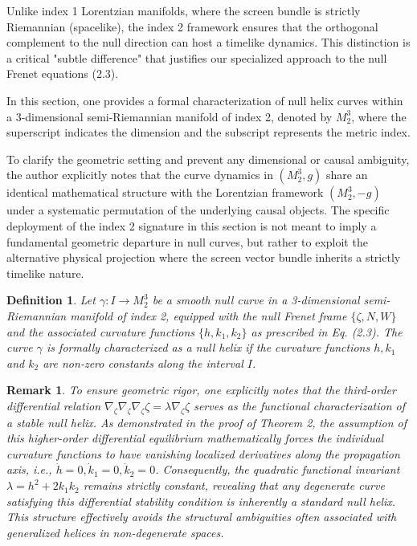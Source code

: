 \documentclass [reqno]{amsart}
\theoremstyle{plain}
\newtheorem{definition}{Definition}
\newtheorem{remark}{Remark}
\numberwithin{equation}{section}
\begin{document}
Unlike index 1 Lorentzian manifolds, where the screen bundle is strictly Riemannian (spacelike), the index 2 framework ensures that the orthogonal complement to the null direction can host a timelike dynamics. This distinction is a critical "subtle difference" that justifies our specialized approach to the null Frenet equations (2.3).

In this section, one provides a formal characterization of null helix curves within a 3-dimensional semi-Riemannian manifold of index 2, denoted by $M_2^3$, where the superscript indicates the dimension and the subscript represents the metric index.

To clarify the geometric setting and prevent any dimensional or causal ambiguity, the author explicitly notes that the curve dynamics in $(M_2^3,g)$ share an identical mathematical structure with the Lorentzian framework $(M_2^3,-g)$ under a systematic permutation of the underlying causal objects. The specific deployment of the index 2 signature in this section is not meant to imply a fundamental geometric departure in null curves, but rather to exploit the alternative physical projection where the screen vector bundle inherits a strictly timelike nature.

\begin{definition}
Let $\gamma:I\rightarrow M_2^3$ be a smooth null curve in a 3-dimensional semi-Riemannian manifold of index 2, equipped with the null Frenet frame $\{\zeta,N,W\}$ and the associated curvature functions $\{h,k_1,k_2\}$ as prescribed in Eq. (2.3). The curve $\gamma$ is formally characterized as a null helix if the curvature functions $h,k_1$ and $k_2$ are non-zero constants along the interval $I$.
\end{definition}

\begin{remark}
To ensure geometric rigor, one explicitly notes that the third-order differential relation $\nabla_\zeta \nabla_\zeta \nabla_\zeta \zeta=\lambda\nabla_\zeta \zeta$ serves as the functional characterization of a stable null helix. As demonstrated in the proof of Theorem 2, the assumption of this higher-order differential equilibrium mathematically forces the individual curvature functions to have vanishing localized derivatives along the propagation axis, i.e., $\dot{h}=0,\dot{k}_1=0,\dot{k}_2=0$. Consequently, the quadratic functional invariant $\lambda=h^2+2k_1 k_2$ remains strictly constant, revealing that any degenerate curve satisfying this differential stability condition is inherently a standard null helix. This structure effectively avoids the structural ambiguities often associated with generalized helices in non-degenerate spaces.
\end{remark}
\end{document}
